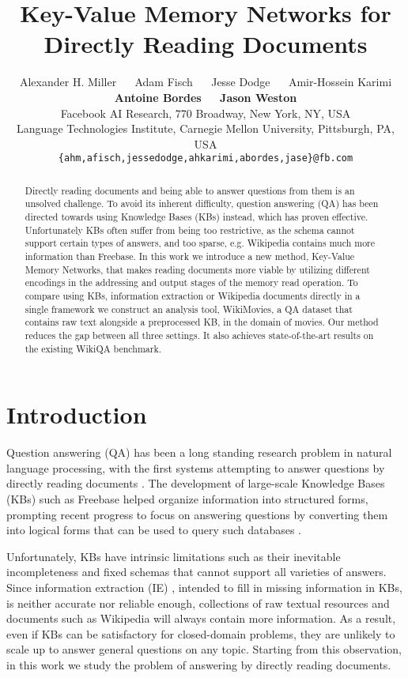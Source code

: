 \documentclass[11pt,letterpaper]{article}
\title{Key-Value Memory Networks for Directly Reading Documents}
\author{
Alexander H. Miller \mbox{~~}
Adam Fisch \mbox{~~}
Jesse Dodge \mbox{~~}
Amir-Hossein Karimi \\
{\bf Antoine Bordes} \mbox{~~}
{\bf Jason Weston} \\
Facebook AI Research, 770 Broadway, New York, NY, USA\\
Language Technologies Institute, Carnegie Mellon University, Pittsburgh, PA, USA\\
{\tt \{ahm,afisch,jessedodge,ahkarimi,abordes,jase\}@fb.com}
 }
\date{}
\begin{document}
\maketitle

\begin{abstract}
Directly reading documents and being able to answer questions from them is an unsolved challenge.
To avoid its inherent difficulty, question answering (QA) has been directed towards
using Knowledge Bases (KBs) instead,
which has proven effective.
Unfortunately KBs often suffer from being too restrictive, as the schema cannot support certain types of answers,
and too sparse, e.g. Wikipedia contains much more information than Freebase.
In this work we introduce a new method, Key-Value Memory Networks,
that makes reading documents more viable
by utilizing different encodings in the addressing  and output stages of the memory read operation.
To compare using  KBs, information extraction or Wikipedia documents directly in a single
framework we construct
 an analysis tool, {\sc WikiMovies}, a QA dataset that contains raw text alongside a preprocessed KB, in the domain of movies.
Our method reduces the gap between all three settings.
It also achieves state-of-the-art results on the existing {\sc WikiQA} benchmark.
\end{abstract}

\section{Introduction}
\vspace{-0.5ex}






Question answering (QA) has been a long standing research problem in
natural language processing, with the first systems attempting to
answer questions by directly reading
documents \citep{voorhees2000building}. The development of large-scale Knowledge Bases (KBs) such as Freebase  \citep{bollacker2008freebase}
helped organize information into structured forms, prompting recent progress to focus on answering questions by converting them into logical forms that can be used to query such databases \citep{berant2013semantic,kwiatkowski-EtAl:2013:EMNLP,fader2014open}.

Unfortunately, KBs have intrinsic limitations such as their inevitable incompleteness and fixed schemas that cannot support all varieties of answers.
Since information extraction (IE) \citep{craven2000learning}, intended to
fill in missing information in KBs, is neither accurate nor
reliable enough, collections of raw textual resources and
documents such as Wikipedia will always contain more information.
As a result, even if KBs can be satisfactory for closed-domain problems, they are unlikely
to scale up to answer general questions on any
topic.
Starting from this observation,
in this work we study the problem
of answering by directly reading documents.
\end{document}

